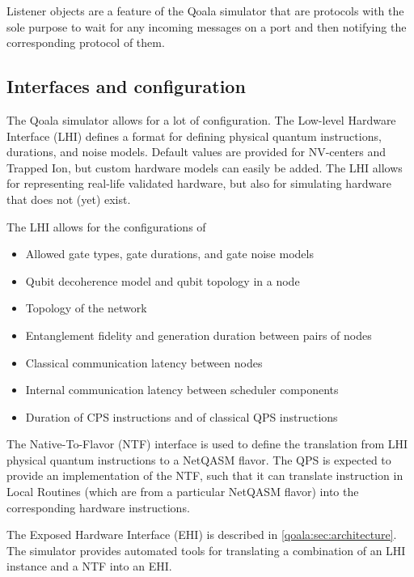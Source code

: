 Listener objects are a feature of the Qoala simulator that are protocols with the sole purpose to wait for any incoming messages on a port and then notifying the corresponding protocol of them.

\subsection{Interfaces and configuration}
The Qoala simulator allows for a lot of configuration.
The Low-level Hardware Interface (LHI) defines a format for defining physical quantum instructions, durations, and noise models.
Default values are provided for NV-centers and Trapped Ion, but custom hardware models can easily be added.
The LHI allows for representing real-life validated hardware, but also for simulating hardware that does not (yet) exist.

The LHI allows for the configurations of
\begin{itemize}
    \item Allowed gate types, gate durations, and gate noise models
    \item Qubit decoherence model and qubit topology in a node
    \item Topology of the network
    \item Entanglement fidelity and generation duration between pairs of nodes
    \item Classical communication latency between nodes
    \item Internal communication latency between scheduler components
    \item Duration of CPS instructions and of classical QPS instructions
\end{itemize}

The Native-To-Flavor (NTF) interface is used to define the translation from LHI physical quantum instructions to a NetQASM flavor.
The QPS is expected to provide an implementation of the NTF, such that it can translate instruction in Local Routines (which are from a particular NetQASM flavor) into the corresponding hardware instructions.

The Exposed Hardware Interface (EHI) is described in \cref{qoala:sec:architecture}.
The simulator provides automated tools for translating a combination of an LHI instance and a NTF into an EHI.

